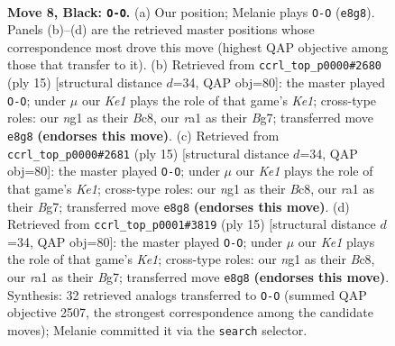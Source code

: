 \documentclass[11pt]{article}
\begin{document}
\begin{figure}[p]\centering
\begin{subfigure}{0.46\textwidth}\centering
\resizebox{\linewidth}{!}{%
\newchessgame
\chessboard[
  setfen={rnbqk2r/pp3pbp/3p1np1/2pP4/4PP1P/2N5/PP4P1/R1BQKBNR b KQkq - 0 8},
  showmover=false,
  pgfstyle=straightmove, color=movearrow, markmove={e8-g8}
]}
\caption{}
\end{subfigure}\hfill
\begin{subfigure}{0.46\textwidth}\centering
\resizebox{\linewidth}{!}{%
\newchessgame
\chessboard[
  setfen={rnbqk2r/pp3pbp/3p1np1/2pP4/4P3/2NB1N2/PP3PPP/R1BQK2R b KQkq - 2 8},
  showmover=false,
  pgfstyle=straightmove, color=movearrow, markmove={e8-g8}
]}
\caption{}
\end{subfigure}
\\[4pt]
\begin{subfigure}{0.46\textwidth}\centering
\resizebox{\linewidth}{!}{%
\newchessgame
\chessboard[
  setfen={rnbqk2r/pp3pbp/3p1np1/2pP4/4P3/2NB1N2/PP3PPP/R1BQK2R b KQkq - 2 8},
  showmover=false,
  pgfstyle=straightmove, color=movearrow, markmove={e8-g8}
]}
\caption{}
\end{subfigure}\hfill
\begin{subfigure}{0.46\textwidth}\centering
\resizebox{\linewidth}{!}{%
\newchessgame
\chessboard[
  setfen={rnbqk2r/pp3pbp/3p1np1/2pP4/4P3/2NB1N2/PP3PPP/R1BQK2R b KQkq - 2 8},
  showmover=false,
  pgfstyle=straightmove, color=movearrow, markmove={e8-g8}
]}
\caption{}
\end{subfigure}
\caption{\textbf{Move 8, Black: \texttt{O-O}.} (a) Our position; Melanie plays \texttt{O-O} (\texttt{e8g8}). Panels (b)--(d) are the retrieved master positions whose correspondence most drove this move (highest QAP objective among those that transfer to it). (b) Retrieved from \texttt{ccrl\_top\_p0000\#2680} (ply 15) [structural distance $d$=34, QAP obj=80]: the master played \texttt{O-O}; under $\mu$ our \emph{Ke1} plays the role of that game's \emph{Ke1}; cross-type roles: our \emph{n}g1 as their \emph{B}c8, our \emph{r}a1 as their \emph{B}g7; transferred move \texttt{e8g8} \textbf{(endorses this move)}. (c) Retrieved from \texttt{ccrl\_top\_p0000\#2681} (ply 15) [structural distance $d$=34, QAP obj=80]: the master played \texttt{O-O}; under $\mu$ our \emph{Ke1} plays the role of that game's \emph{Ke1}; cross-type roles: our \emph{n}g1 as their \emph{B}c8, our \emph{r}a1 as their \emph{B}g7; transferred move \texttt{e8g8} \textbf{(endorses this move)}. (d) Retrieved from \texttt{ccrl\_top\_p0001\#3819} (ply 15) [structural distance $d$=34, QAP obj=80]: the master played \texttt{O-O}; under $\mu$ our \emph{Ke1} plays the role of that game's \emph{Ke1}; cross-type roles: our \emph{n}g1 as their \emph{B}c8, our \emph{r}a1 as their \emph{B}g7; transferred move \texttt{e8g8} \textbf{(endorses this move)}. Synthesis: 32 retrieved analogs transferred to \texttt{O-O} (summed QAP objective 2507, the strongest correspondence among the candidate moves); Melanie committed it via the \texttt{search} selector.}
\label{fig:thought-m15}
\end{figure}
\end{document}
